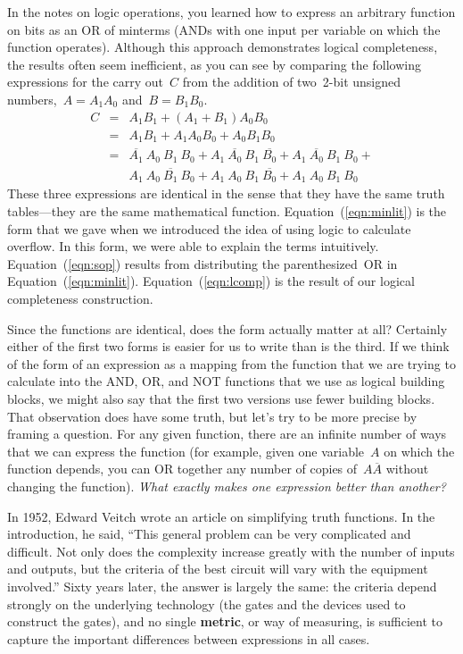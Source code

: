 In the notes on logic operations, you learned how to express an
arbitrary function on bits as an OR of minterms (ANDs with one
input per variable on which the function operates). 
Although this approach demonstrates logical completeness, the results
often seem inefficient, as you can see by comparing the following 
expressions for the carry out~$C$ from the
addition of two~\mbox{2-bit} unsigned numbers,~$A=A_1A_0$ and~$B=B_1B_0$.
%
\begin{eqnarray}
C &=& A_1B_1 + (A_1+B_1)A_0B_0 \label{eqn:minlit} \\
&=& A_1B_1 + A_1A_0B_0 + A_0B_1B_0 \label{eqn:sop} \\
&=& 
\nonumber \overline{A_1}~A_0~B_1~B_0 +
A_1~\overline{A_0}~B_1~\overline{B_0} +
A_1~\overline{A_0}~B_1~B_0 +\\
&&A_1~A_0~\overline{B_1}~B_0 +
A_1~A_0~B_1~\overline{B_0} +
A_1~A_0~B_1~B_0 \label{eqn:lcomp}
\end{eqnarray}
%
These three expressions are identical in the sense that they have
the same truth tables---they are the same mathematical function.
%
Equation~(\ref{eqn:minlit}) is the form that we gave when we introduced
the idea of using logic to calculate overflow.  In this form, we were
able to explain the terms intuitively.
%
Equation~(\ref{eqn:sop}) results from distributing the parenthesized~OR
in Equation~(\ref{eqn:minlit}).
%
Equation~(\ref{eqn:lcomp}) is the result of our logical completeness
construction.  

Since the functions are identical, does the form actually matter at all?
Certainly either of the first two forms is easier for us to write 
than is the third.  If we think
of the form of an expression as a mapping from the function that we
are trying to calculate into the AND, OR, and NOT functions that we
use as logical building blocks, we might also say that the first two
versions use fewer building blocks.  That observation does have some
truth, but let's try to be more precise by framing a question.
%
For any given function, there are an infinite number of ways that we can
express the function (for example, given one variable~$A$ on which the
function depends, you can OR together any number of copies 
of~$A\overline{A}$ without changing the function).
%
{\em What exactly makes one expression better than another?}

\pagebreak

In 1952, Edward Veitch wrote an article on simplifying truth functions.
In the introduction, he said, ``This general problem can be very complicated
and difficult.  Not only does the complexity increase greatly with the
number of inputs and outputs, but the criteria of the best circuit will
vary with the equipment involved.''
%
Sixty years later, the answer is largely the same: the criteria depend
strongly on the underlying technology (the gates and the devices used
to construct the gates), and no single {\bf metric}, or way of measuring,
is sufficient to capture the important differences between expressions 
in all cases.

